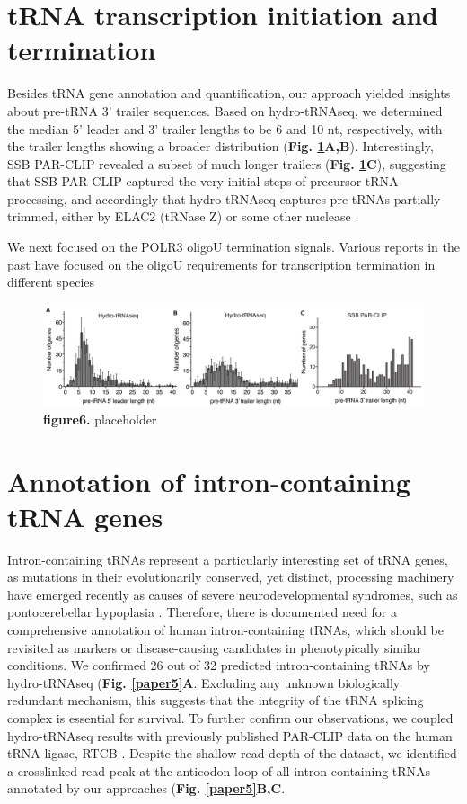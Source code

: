 \documentclass[12pt]{rockefeller}
\begin{document}
\section{tRNA transcription initiation and termination}

Besides tRNA gene annotation and quantification, our approach yielded insights about pre-tRNA 3’ trailer sequences. Based on hydro-tRNAseq, we determined the median 5’ leader and 3’ trailer lengths to be 6 and 10 nt, respectively, with the trailer lengths showing a broader distribution (\textbf{Fig. \ref{paper6}A,B}). Interestingly, SSB PAR-CLIP revealed a subset of much longer trailers (\textbf{Fig. \ref{paper6}C}), suggesting that SSB PAR-CLIP captured the very initial steps of precursor tRNA processing, and accordingly that hydro-tRNAseq captures pre-tRNAs partially trimmed, either by ELAC2 (tRNase Z) or some other nuclease \cite{Phizicky:2010jf}.

We next focused on the POLR3 oligoU termination signals. Various reports in the past have focused on the oligoU requirements for transcription termination in different species \cite{Arimbasseri:2014hj}

 

\begin{figure}[!ht]%
\centering
\includegraphics[width=\textwidth]{paper6.png}%
\caption[figure6]
{\textbf{figure6.}
placeholder}
\centering
\label{paper6}%
\end{figure}

\section{Annotation of intron-containing tRNA genes}

Intron-containing tRNAs represent a particularly interesting set of tRNA genes, as mutations in their evolutionarily conserved, yet distinct, processing machinery have emerged recently as causes of severe neurodevelopmental syndromes, such as pontocerebellar hypoplasia \cite{Namavar:2011ew}. Therefore, there is documented need for a comprehensive annotation of human intron-containing tRNAs, which should be revisited as markers or disease-causing candidates in phenotypically similar conditions. We confirmed 26 out of 32 predicted intron-containing tRNAs by hydro-tRNAseq (\textbf{Fig. \ref{paper5}A}. Excluding any unknown biologically redundant mechanism, this suggests that the integrity of the tRNA splicing complex is essential for survival. To further confirm our observations, we coupled hydro-tRNAseq results with previously published PAR-CLIP data on the human tRNA ligase, RTCB \cite{Baltz:2012bh}. Despite the shallow read depth of the dataset, we identified a crosslinked read peak at the anticodon loop of all intron-containing tRNAs annotated by our approaches (\textbf{Fig. \ref{paper5}B,C}.
\end{document}
